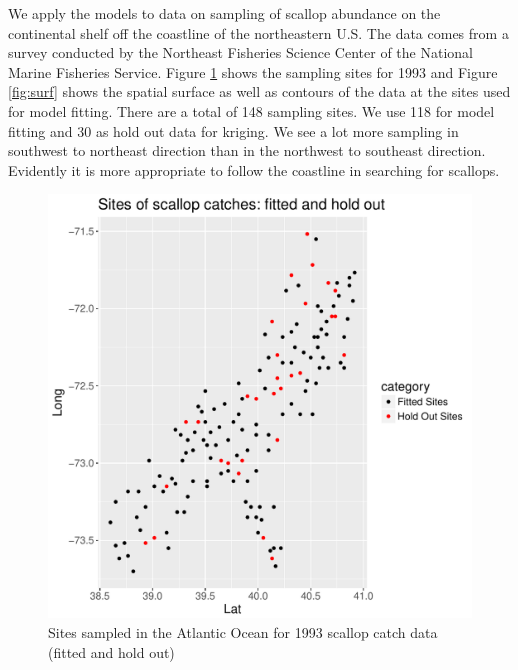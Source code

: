 \documentclass[12pt,twoside]{dukestatscithesis}
\theoremstyle{definition}
\theoremstyle{definition}
\theoremstyle{definition}
\theoremstyle{remark}
\begin{document}
We apply the models to data on sampling of scallop abundance on the
continental shelf off the coastline of the northeastern U.S. The data
comes from a survey conducted by the Northeast Fisheries Science Center
of the National Marine Fisheries Service. Figure \ref{fig:scallop} shows
the sampling sites for 1993 and Figure \ref{fig:surf} shows the spatial
surface as well as contours of the data at the sites used for model
fitting. There are a total of 148 sampling sites. We use 118 for model
fitting and 30 as hold out data for kriging. We see a lot more sampling
in southwest to northeast direction than in the northwest to southeast
direction. Evidently it is more appropriate to follow the coastline in
searching for scallops.
\begin{figure}
\includegraphics[scale=0.7]{figure/scallop_sites} \caption{Sites sampled in the Atlantic Ocean for 1993 scallop catch data (fitted and hold out)}\label{fig:scallop}
\end{figure}
\end{document}
